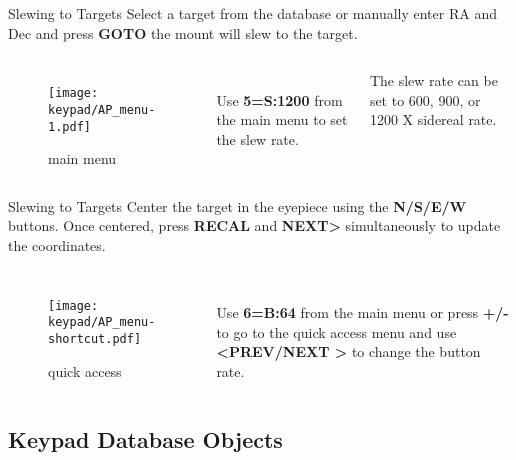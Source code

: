 
\begin{frame}[t]{Slewing to Targets}
  \large
  Select a target from the database or manually enter RA and Dec and press
  \textbf{GOTO} the mount will slew to the target. 
    
\begin{columns}[T]
  
    \begin{figure}[h]
        \texttt{[image: keypad/AP\_menu-1.pdf]}
      \caption{main menu}
    \end{figure}
  \ \\
    Use \textbf{5=S:1200} from the main menu to set the slew rate.
    
    The slew rate can be set to 600, 900, or 1200 X sidereal rate.
\end{columns}
\end{frame}


\begin{frame}[t]{Slewing to Targets}
  \large
  Center  the target in the eyepiece using the \textbf{N/S/E/W} buttons. 
  Once centered, press \textbf{RECAL} and \textbf{NEXT>} simultaneously
  to update the coordinates.
  
\begin{columns}[T]
    \begin{figure}[h]
        \texttt{[image: keypad/AP\_menu-shortcut.pdf]}
      \caption{quick access}
    \end{figure}
  \ \\
    Use \textbf{6=B:64} from the main menu or press \textbf{+/-} to go to the
    quick access menu and use \textbf{\textless PREV/NEXT \textgreater} to change
    the button rate.
\end{columns}
\end{frame}
\subsection{Keypad Database Objects}

